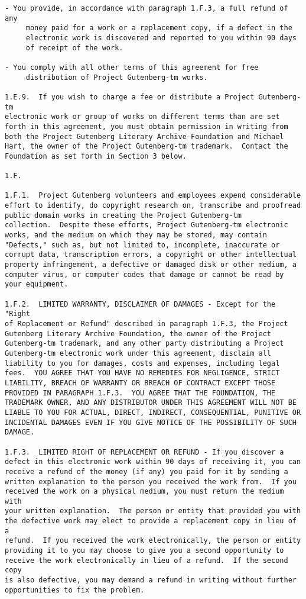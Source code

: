 \documentclass[12pt,oneside]{book}
\begin{document}
\begin{verbatim}
- You provide, in accordance with paragraph 1.F.3, a full refund of any
     money paid for a work or a replacement copy, if a defect in the
     electronic work is discovered and reported to you within 90 days
     of receipt of the work.

- You comply with all other terms of this agreement for free
     distribution of Project Gutenberg-tm works.

1.E.9.  If you wish to charge a fee or distribute a Project Gutenberg-tm
electronic work or group of works on different terms than are set
forth in this agreement, you must obtain permission in writing from
both the Project Gutenberg Literary Archive Foundation and Michael
Hart, the owner of the Project Gutenberg-tm trademark.  Contact the
Foundation as set forth in Section 3 below.

1.F.

1.F.1.  Project Gutenberg volunteers and employees expend considerable
effort to identify, do copyright research on, transcribe and proofread
public domain works in creating the Project Gutenberg-tm
collection.  Despite these efforts, Project Gutenberg-tm electronic
works, and the medium on which they may be stored, may contain
"Defects," such as, but not limited to, incomplete, inaccurate or
corrupt data, transcription errors, a copyright or other intellectual
property infringement, a defective or damaged disk or other medium, a
computer virus, or computer codes that damage or cannot be read by
your equipment.

1.F.2.  LIMITED WARRANTY, DISCLAIMER OF DAMAGES - Except for the "Right
of Replacement or Refund" described in paragraph 1.F.3, the Project
Gutenberg Literary Archive Foundation, the owner of the Project
Gutenberg-tm trademark, and any other party distributing a Project
Gutenberg-tm electronic work under this agreement, disclaim all
liability to you for damages, costs and expenses, including legal
fees.  YOU AGREE THAT YOU HAVE NO REMEDIES FOR NEGLIGENCE, STRICT
LIABILITY, BREACH OF WARRANTY OR BREACH OF CONTRACT EXCEPT THOSE
PROVIDED IN PARAGRAPH 1.F.3.  YOU AGREE THAT THE FOUNDATION, THE
TRADEMARK OWNER, AND ANY DISTRIBUTOR UNDER THIS AGREEMENT WILL NOT BE
LIABLE TO YOU FOR ACTUAL, DIRECT, INDIRECT, CONSEQUENTIAL, PUNITIVE OR
INCIDENTAL DAMAGES EVEN IF YOU GIVE NOTICE OF THE POSSIBILITY OF SUCH
DAMAGE.

1.F.3.  LIMITED RIGHT OF REPLACEMENT OR REFUND - If you discover a
defect in this electronic work within 90 days of receiving it, you can
receive a refund of the money (if any) you paid for it by sending a
written explanation to the person you received the work from.  If you
received the work on a physical medium, you must return the medium with
your written explanation.  The person or entity that provided you with
the defective work may elect to provide a replacement copy in lieu of a
refund.  If you received the work electronically, the person or entity
providing it to you may choose to give you a second opportunity to
receive the work electronically in lieu of a refund.  If the second copy
is also defective, you may demand a refund in writing without further
opportunities to fix the problem.


\end{verbatim}
\end{document}
